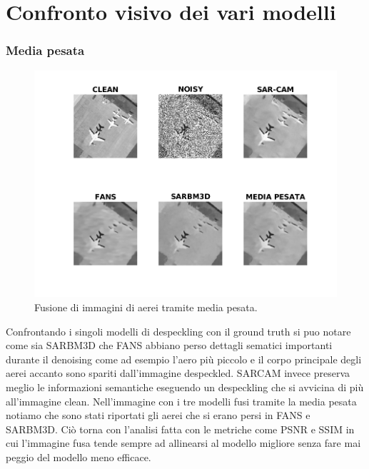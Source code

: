   \section{Confronto visivo dei vari modelli}
  \subsubsection{Media pesata}
  \begin{figure}[H]
    \centering
    \includegraphics[width=1.1\textwidth]{utils/MPairplane00.png}
    \caption{Fusione di immagini di aerei tramite media pesata.}
    \label{fig:airplane00MP}
  \end{figure}
Confrontando i singoli modelli di despeckling con il ground truth si puo notare come sia SARBM3D che FANS abbiano 
perso dettagli sematici importanti durante il denoising come ad esempio l'aero più piccolo e il corpo principale degli aerei accanto sono spariti dall'immagine despeckled.
SARCAM invece preserva meglio le informazioni semantiche eseguendo un despeckling che si avvicina di più all'immagine clean.
Nell'immagine con i tre modelli fusi tramite la media pesata notiamo che sono stati riportati gli aerei che si erano persi in FANS e SARBM3D. 
Ciò torna con l'analisi fatta con le metriche come PSNR e SSIM in cui l'immagine fusa tende sempre ad allinearsi al modello migliore senza fare mai 
peggio del modello meno efficace.
